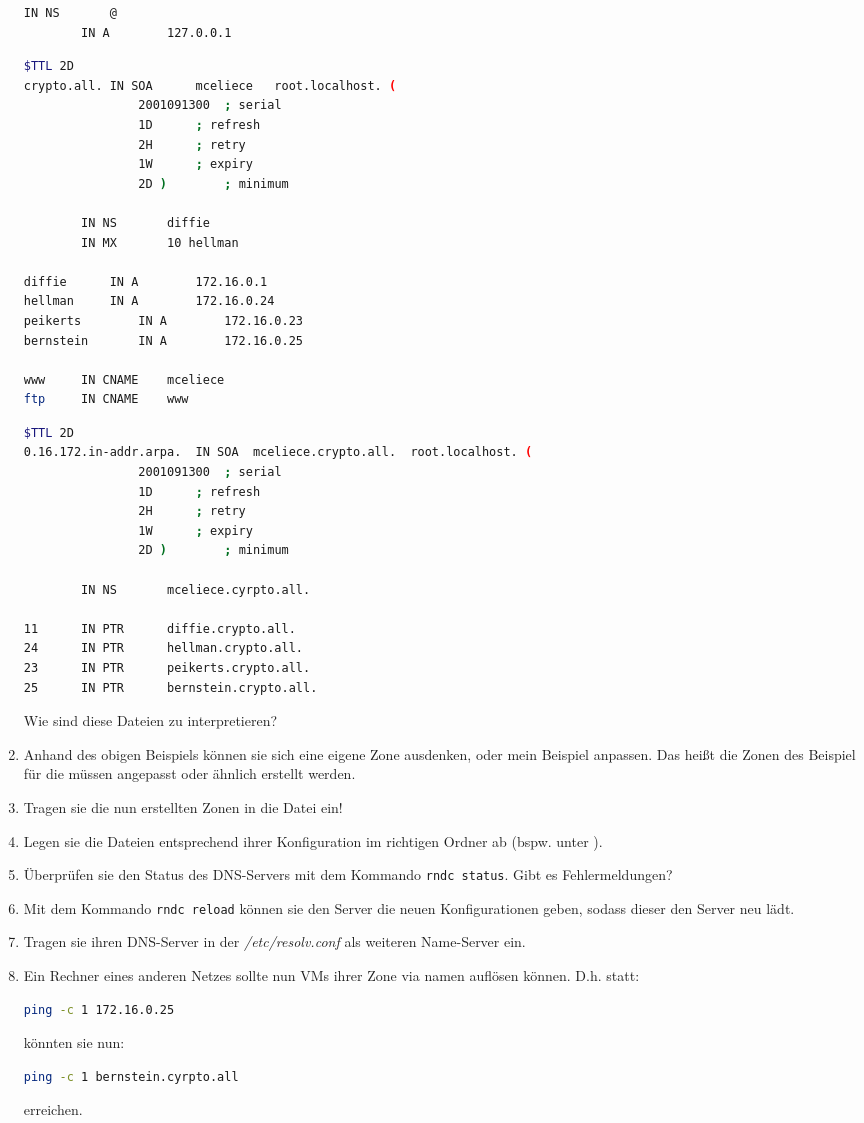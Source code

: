 \documentclass[paper=a4,fontsize=11pt]{scrartcl}%
\numberwithin{equation}{section}
\begin{document}
\begin{enumerate}
\begin{lstlisting}[style=Bash, language=Bash]
		IN NS		@
		IN A		127.0.0.1
\end{lstlisting}

\begin{lstlisting}[style=Bash, language=Bash]
$TTL 2D
crypto.all.	IN SOA		mceliece   root.localhost. (
				2001091300	; serial
				1D		; refresh
				2H		; retry
				1W		; expiry
				2D )		; minimum

		IN NS		diffie
		IN MX		10 hellman

diffie		IN A		172.16.0.1
hellman	    IN A		172.16.0.24
peikerts		IN A		172.16.0.23
bernstein		IN A		172.16.0.25

www		IN CNAME	mceliece
ftp		IN CNAME	www
\end{lstlisting}

\begin{lstlisting}[style=Bash, language=Bash]
$TTL 2D
0.16.172.in-addr.arpa.  IN SOA  mceliece.crypto.all.  root.localhost. (
				2001091300	; serial
				1D		; refresh
				2H		; retry
				1W		; expiry
				2D )		; minimum

		IN NS		mceliece.cyrpto.all.

11		IN PTR		diffie.crypto.all.
24		IN PTR		hellman.crypto.all.
23		IN PTR		peikerts.crypto.all.
25		IN PTR  	bernstein.crypto.all.
\end{lstlisting}
Wie sind diese Dateien zu interpretieren?
	\item Anhand des obigen Beispiels können sie sich eine eigene Zone ausdenken, oder mein Beispiel anpassen. Das heißt die Zonen des Beispiel für die  müssen angepasst oder ähnlich erstellt werden.
	\item Tragen sie die nun erstellten Zonen in die  Datei ein!
	\item Legen sie die Dateien entsprechend ihrer Konfiguration im richtigen Ordner ab (bspw. unter ).
	\item Überprüfen sie den Status des DNS-Servers mit dem Kommando \texttt{rndc status}. Gibt es Fehlermeldungen?
	\item Mit dem Kommando \texttt{rndc reload} können sie den Server die neuen Konfigurationen geben, sodass dieser den Server neu lädt.
		\item Tragen sie ihren DNS-Server in der \emph{/etc/resolv.conf} als weiteren Name-Server ein.
		\item Ein Rechner eines anderen Netzes sollte nun VMs ihrer Zone via namen auflösen können. D.h. statt:
		\begin{lstlisting}[style=Bash, language=Bash]
ping -c 1 172.16.0.25 
		\end{lstlisting}
		könnten sie nun:
		\begin{lstlisting}[style=Bash, language=Bash]
ping -c 1 bernstein.cyrpto.all
		\end{lstlisting}
		erreichen.
\end{enumerate}
\end{document}
